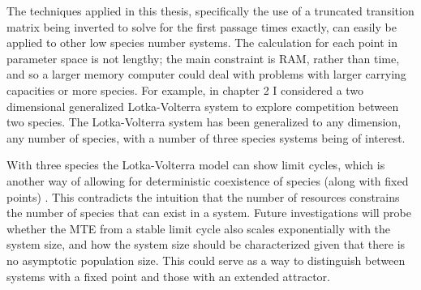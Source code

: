 The techniques applied in this thesis, specifically the use of a truncated transition matrix being inverted to solve for the first passage times exactly, can easily be applied to other low species number systems. 
The calculation for each point in parameter space is not lengthy; the main constraint is RAM, rather than time, and so a larger memory computer could deal with problems with larger carrying capacities or more species. %
For example, in chapter 2 I considered a two dimensional generalized Lotka-Volterra system to explore competition between two species. 
The Lotka-Volterra system has been generalized to any dimension, any number of species, with a number of three species systems being of interest. 
\iffalse
From the two dimensional Lotka-Volterra system one arrives at the predator-prey system by choosing the parameters correctly. 
One can also move to the third dimension, in order to account for a third species in the system. 
This allows for the investigation of many systems of interest, with much more diversity. 
The simplest extension in this regard would be to have three species all with overlapping niches \cite{MacArthur1970}. 
I could observe how a species whose niche is situated between those of two others (such that they each overlap with the first species but not with each other) would go extinct more readily as the overlap of the encroaching species is increased. 
\fi
With three species the Lotka-Volterra model can show limit cycles, which is another way of allowing for deterministic coexistence of species (along with fixed points) \cite{Smale1976,Armstrong1976}. 
This contradicts the intuition that the number of resources constrains the number of species that can exist in a system. 
Future investigations will probe whether the MTE from a stable limit cycle also scales exponentially with the system size, and how the system size should be characterized given that there is no asymptotic population size. 
This could serve as a way to distinguish between systems with a fixed point and those with an extended attractor. 
